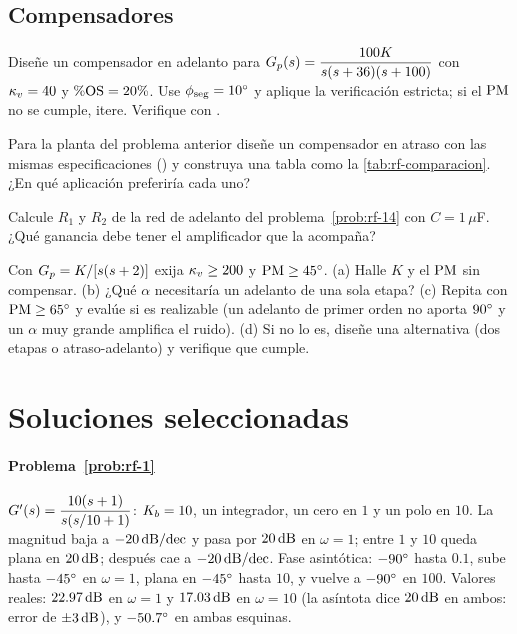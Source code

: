 \subsection*{Compensadores}

\begin{problema}[adelanto]\label{prob:rf-14}
Diseñe un compensador en adelanto para $G_p(s)=\dfrac{100K}{s(s+36)(s+100)}$ con $\kappa_v=40$ y $\%\mathrm{OS}=20\%$. Use $\phi_{\mathrm{seg}}=10^{\circ}$ y aplique la verificación estricta; si el $\mathrm{PM}$ no se cumple, itere. \etiquetaM{} Verifique con .
\end{problema}

\begin{problema}\label{prob:rf-15}
Para la planta del problema anterior diseñe un compensador en atraso con las mismas especificaciones () y construya una tabla como la \cref{tab:rf-comparacion}. ¿En qué aplicación preferiría cada uno?
\end{problema}

\begin{problema}[implementación]\label{prob:rf-16}
Calcule $R_1$ y $R_2$ de la red de adelanto del problema~\ref{prob:rf-14} con $C=1\,\mu$F. ¿Qué ganancia debe tener el amplificador que la acompaña?
\end{problema}

\begin{problema}\label{prob:rf-17}
\etiquetaEstrella{} Con $G_p=K/[s(s+2)]$ exija $\kappa_v\geq200$ y $\mathrm{PM}\geq45^{\circ}$. (a) Halle $K$ y el $\mathrm{PM}$ sin compensar. (b) ¿Qué $\alpha$ necesitaría un adelanto de una sola etapa? (c) Repita con $\mathrm{PM}\geq65^{\circ}$ y evalúe si es realizable (un adelanto de primer orden no aporta $90^{\circ}$ y un $\alpha$ muy grande amplifica el ruido). (d) Si no lo es, diseñe una alternativa (dos etapas o atraso-adelanto) y verifique que cumple.
\end{problema}

\section{Soluciones seleccionadas}

\paragraph{Problema~\ref{prob:rf-1}}
$G'(s)=\dfrac{10(s+1)}{s(s/10+1)}$: $K_b=10$, un integrador, un cero en $1$ y un polo en $10$. La magnitud baja a $-20\,\mathrm{dB/dec}$ y pasa por $20\,\mathrm{dB}$ en $\omega=1$; entre $1$ y $10$ queda plana en $20\,\mathrm{dB}$; después cae a $-20\,\mathrm{dB/dec}$. Fase asintótica: $-90^{\circ}$ hasta $0.1$, sube hasta $-45^{\circ}$ en $\omega=1$, plana en $-45^{\circ}$ hasta $10$, y vuelve a $-90^{\circ}$ en $100$. Valores reales: $22.97\,\mathrm{dB}$ en $\omega=1$ y $17.03\,\mathrm{dB}$ en $\omega=10$ (la asíntota dice $20\,\mathrm{dB}$ en ambos: error de $\pm3\,\mathrm{dB}$), y $-50.7^{\circ}$ en ambas esquinas.

